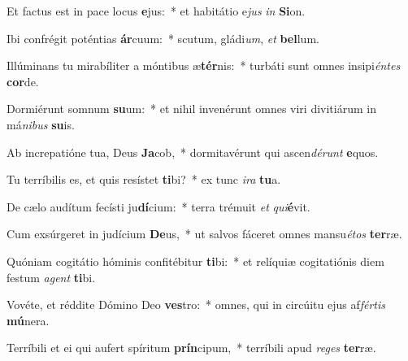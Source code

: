 \item Et factus est in pace locus \textbf{e}jus:~* et habitátio e\textit{jus} \textit{in} \textbf{Si}on.
\item Ibi confrégit poténtias \textbf{ár}cuum:~* scutum, gládi\textit{um}, \textit{et} \textbf{bel}lum.
\item Illúminans tu mirabíliter a móntibus æ\textbf{tér}nis:~* turbáti sunt omnes insipi\textit{én}\textit{tes} \textbf{cor}de.
\item Dormiérunt somnum \textbf{su}um:~* et nihil invenérunt omnes viri divitiárum in má\textit{ni}\textit{bus} \textbf{su}is.
\item Ab increpatióne tua, Deus \textbf{Ja}cob,~* dormitavérunt qui ascen\textit{dé}\textit{runt} \textbf{e}quos.
\item Tu terríbilis es, et quis resístet \textbf{ti}bi?~* ex tunc \textit{i}\textit{ra} \textbf{tu}a.
\item De cælo audítum fecísti ju\textbf{dí}cium:~* terra trémuit \textit{et} \textit{qui}\textbf{é}vit.
\item Cum exsúrgeret in judícium \textbf{De}us,~* ut salvos fáceret omnes mansu\textit{é}\textit{tos} \textbf{ter}ræ.
\item Quóniam cogitátio hóminis confitébitur \textbf{ti}bi:~* et relíquiæ cogitatiónis diem festum \textit{a}\textit{gent} \textbf{ti}bi.
\item Vovéte, et réddite Dómino Deo \textbf{ves}tro:~* omnes, qui in circúitu ejus af\textit{fér}\textit{tis} \textbf{mú}nera.
\item Terríbili et ei qui aufert spíritum \textbf{prín}cipum,~* terríbili apud \textit{re}\textit{ges} \textbf{ter}ræ.
